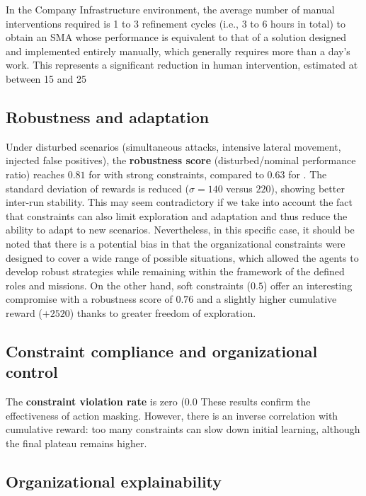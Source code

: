   In the Company Infrastructure environment, the average number of manual interventions required is 1 to 3 refinement cycles (i.e., 3 to 6 hours in total) to obtain an SMA whose performance is equivalent to that of a solution designed and implemented entirely manually, which generally requires more than a day's work. This represents a significant reduction in human intervention, estimated at between 15 and 25%

  \subsection*{Robustness and adaptation}

  Under disturbed scenarios (simultaneous attacks, intensive lateral movement, injected false positives), the \textbf{robustness score} (disturbed/nominal performance ratio) reaches $0.81$ for  with strong constraints, compared to $0.63$ for .
  The standard deviation of rewards is reduced ($\sigma = 140$ versus $220$), showing better inter-run stability. This may seem contradictory if we take into account the fact that constraints can also limit exploration and adaptation and thus reduce the ability to adapt to new scenarios. Nevertheless, in this specific case, it should be noted that there is a potential bias in that the organizational constraints were designed to cover a wide range of possible situations, which allowed the agents to develop robust strategies while remaining within the framework of the defined roles and missions.
  On the other hand, soft constraints ($0.5$) offer an interesting compromise with a robustness score of $0.76$ and a slightly higher cumulative reward ($+2520$) thanks to greater freedom of exploration.

  \subsection*{Constraint compliance and organizational control}

  The \textbf{constraint violation rate} is zero (0.0%
  These results confirm the effectiveness of action masking.
  However, there is an inverse correlation with cumulative reward: too many constraints can slow down initial learning, although the final plateau remains higher.

  \subsection*{Organizational explainability}

